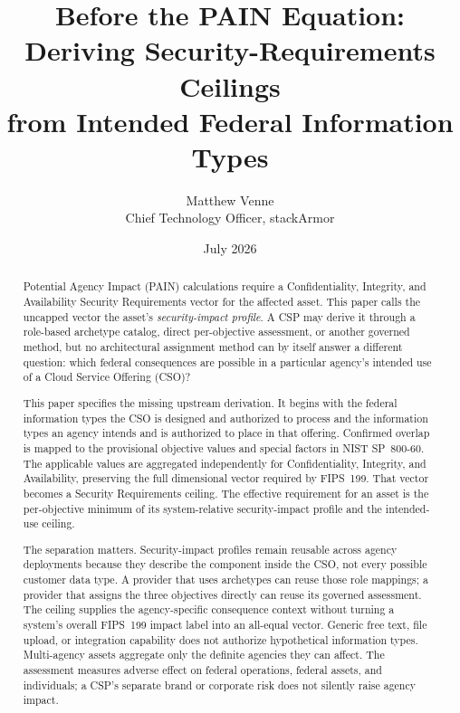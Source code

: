 \documentclass[11pt]{article}
\title{\bfseries Before the PAIN Equation:\\
Deriving Security-Requirements Ceilings\\
from Intended Federal Information Types}
\author{Matthew Venne \\ \small Chief Technology Officer, stackArmor}
\date{July 2026}
\begin{document}
\maketitle

\begin{abstract}
\noindent
Potential Agency Impact (PAIN) calculations require a Confidentiality, Integrity,
and Availability Security Requirements vector for the affected asset. This paper
calls the uncapped vector the asset's \emph{security-impact profile}. A CSP may
derive it through a role-based archetype catalog, direct per-objective assessment,
or another governed method, but no architectural assignment method can by itself
answer a different question: which federal consequences are possible in a
particular agency's intended use of a Cloud Service Offering (CSO)?

This paper specifies the missing upstream derivation. It begins with the federal
information types the CSO is designed and authorized to process and the information
types an agency intends and is authorized to place in that offering. Confirmed
overlap is mapped to the provisional objective values and special factors in NIST
SP~800-60. The applicable values are aggregated independently for Confidentiality,
Integrity, and Availability, preserving the full dimensional vector required by
FIPS~199. That vector becomes a Security Requirements ceiling. The effective
requirement for an asset is the per-objective minimum of its system-relative
security-impact profile and the intended-use ceiling.

The separation matters. Security-impact profiles remain reusable across agency
deployments because they describe the component inside the CSO, not every possible
customer data type. A provider that uses archetypes can reuse those role mappings;
a provider that assigns the three objectives directly can reuse its governed
assessment. The ceiling supplies the agency-specific consequence context without
turning a system's overall FIPS~199 impact label into an all-equal vector. Generic
free text, file upload, or integration capability does not authorize hypothetical
information types. Multi-agency assets aggregate only the definite agencies they can
affect. The assessment measures adverse effect on federal operations, federal
assets, and individuals; a CSP's separate brand or corporate risk does not silently
raise agency impact.


\end{abstract}
\end{document}
